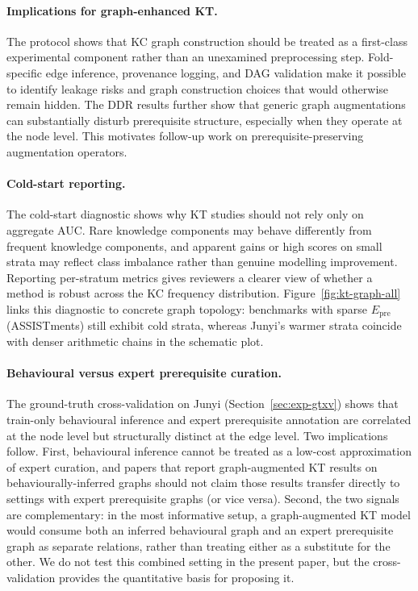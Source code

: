 \documentclass[runningheads]{llncs}
\newcommand{\Epre}{\ensuremath{E_{\text{pre}}}}
\newcommand{\KCs}{knowledge components}
\newcommand{\DDR}{\textsc{DDR}}
\begin{document}
\paragraph{Implications for graph-enhanced KT.}
The protocol shows that KC graph construction should be treated as a
first-class experimental component rather than an unexamined
preprocessing step. Fold-specific edge inference, provenance logging,
and DAG validation make it possible to identify leakage risks and graph
construction choices that would otherwise remain hidden. The \DDR{}
results further show that generic graph augmentations can substantially
disturb prerequisite structure, especially when they operate at the node
level. This motivates follow-up work on prerequisite-preserving
augmentation operators.
\paragraph{Cold-start reporting.}
The cold-start diagnostic shows why KT studies should not rely only on
aggregate AUC. Rare \KCs{} may behave differently from frequent
\KCs{}, and apparent gains or high scores on small strata may reflect
class imbalance rather than genuine modelling improvement. Reporting
per-stratum metrics gives reviewers a clearer view of whether a method
is robust across the KC frequency distribution.
Figure~\ref{fig:kt-graph-all} links this diagnostic to concrete graph
topology: benchmarks with sparse $\Epre$ (ASSISTments) still exhibit
cold strata, whereas Junyi's warmer strata coincide with denser arithmetic
chains in the schematic plot.

\paragraph{Behavioural versus expert prerequisite curation.}
The ground-truth cross-validation on Junyi
(Section~\ref{sec:exp-gtxv}) shows that train-only behavioural
inference and expert prerequisite annotation are correlated at the
node level but structurally distinct at the edge level. Two
implications follow. First, behavioural inference cannot be treated
as a low-cost approximation of expert curation, and papers that
report graph-augmented KT results on behaviourally-inferred graphs
should not claim those results transfer directly to settings with
expert prerequisite graphs (or vice versa). Second, the two signals
are complementary: in the most informative setup, a graph-augmented
KT model would consume both an inferred behavioural graph and an
expert prerequisite graph as separate relations, rather than treating
either as a substitute for the other. We do not test this combined
setting in the present paper, but the cross-validation provides the
quantitative basis for proposing it.
\end{document}
